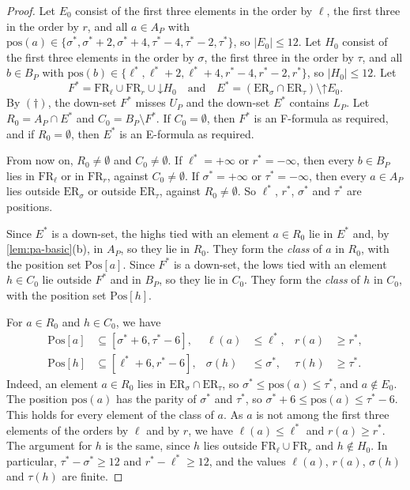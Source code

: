 \documentclass[pdflatex,sn-mathphys-num]{sn-jnl}%
\theoremstyle{thmstyleone}%
\theoremstyle{thmstyletwo}%
\theoremstyle{thmstylethree}%
\newcommand{\dn}{\mathord{\downarrow}}%
\newcommand{\upp}{\mathord{\uparrow}}%
\newcommand{\pos}{\mathrm{pos}}%
\newcommand{\Pos}{\mathrm{Pos}}%
\newcommand{\FR}{\mathrm{FR}}%
\newcommand{\ER}{\mathrm{ER}}%
\begin{document}
\begin{proof}
Let $E_0$ consist of the first three elements in the order by $\ell$, the first three in the order by $r$, and all $a \in A_P$ with $\pos(a) \in \{\sigma^*, \sigma^* + 2, \sigma^* + 4, \tau^* - 4, \tau^* - 2, \tau^*\}$, so $|E_0| \leq 12$.
Let $H_0$ consist of the first three elements in the order by $\sigma$, the first three in the order by $\tau$, and all $b \in B_P$ with $\pos(b) \in \{\ell^*, \ell^* + 2, \ell^* + 4, r^* - 4, r^* - 2, r^*\}$, so $|H_0| \leq 12$.
Let
\[
F^* = \FR_\ell \cup \FR_r \cup \dn H_0 \quad\text{and}\quad E^* = (\ER_\sigma \cap \ER_\tau) \setminus \upp E_0.
\]
By $(\dagger)$, the down-set $F^*$ misses $U_P$ and the down-set $E^*$ contains $L_P$.
Let $R_0 = A_P \cap E^*$ and $C_0 = B_P \setminus F^*$.
If $C_0 = \emptyset$, then $F^*$ is an F-formula as required, and if $R_0 = \emptyset$, then $E^*$ is an E-formula as required.

From now on, $R_0 \neq \emptyset$ and $C_0 \neq \emptyset$.
If $\ell^* = +\infty$ or $r^* = -\infty$, then every $b \in B_P$ lies in $\FR_\ell$ or in $\FR_r$, against $C_0 \neq \emptyset$.
If $\sigma^* = +\infty$ or $\tau^* = -\infty$, then every $a \in A_P$ lies outside $\ER_\sigma$ or outside $\ER_\tau$, against $R_0 \neq \emptyset$.
So $\ell^*$, $r^*$, $\sigma^*$ and $\tau^*$ are positions.

Since $E^*$ is a down-set, the highs tied with an element $a \in R_0$ lie in $E^*$ and, by \cref{lem:pa-basic}(b), in $A_P$, so they lie in $R_0$.
They form the \emph{class} of $a$ in $R_0$, with the position set $\Pos[a]$.
Since $F^*$ is a down-set, the lows tied with an element $h \in C_0$ lie outside $F^*$ and in $B_P$, so they lie in $C_0$.
They form the \emph{class} of $h$ in $C_0$, with the position set $\Pos[h]$.

For $a \in R_0$ and $h \in C_0$, we have
\begin{align}
\label{eq:pa-ranges-r}
\Pos[a] &\subseteq [\sigma^* + 6, \tau^* - 6], & \ell(a) &\leq \ell^*, & r(a) &\geq r^*,\\
\label{eq:pa-ranges-c}
\Pos[h] &\subseteq [\ell^* + 6, r^* - 6], & \sigma(h) &\leq \sigma^*, & \tau(h) &\geq \tau^*.
\end{align}
Indeed, an element $a \in R_0$ lies in $\ER_\sigma \cap \ER_\tau$, so $\sigma^* \leq \pos(a) \leq \tau^*$, and $a \notin E_0$.
The position $\pos(a)$ has the parity of $\sigma^*$ and $\tau^*$, so $\sigma^* + 6 \leq \pos(a) \leq \tau^* - 6$.
This holds for every element of the class of $a$.
As $a$ is not among the first three elements of the orders by $\ell$ and by $r$, we have $\ell(a) \leq \ell^*$ and $r(a) \geq r^*$.
The argument for $h$ is the same, since $h$ lies outside $\FR_\ell \cup \FR_r$ and $h \notin H_0$.
In particular, $\tau^* - \sigma^* \geq 12$ and $r^* - \ell^* \geq 12$, and the values $\ell(a)$, $r(a)$, $\sigma(h)$ and $\tau(h)$ are finite.


\end{proof}
\end{document}
